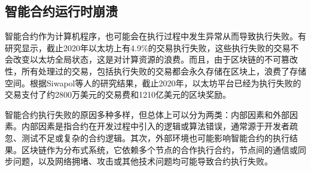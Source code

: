 \begin{enumerate}[label=(\arabic*)]
    
\end{enumerate}
\subsection{智能合约运行时崩溃}
\label{sec:智能合约运行时崩溃}
智能合约作为计算机程序，也可能会在执行过程中发生异常从而导致执行失败。有研究显示\cite{reducing2020}，截止2020年以太坊上有4.9\%的交易执行失败，这些执行失败的交易不会改变以太坊全局状态，这是对计算资源的浪费。而且，由于区块链的不可篡改性，所有处理过的交易，包括执行失败的交易都会永久存储在区块上，浪费了存储空间。根据Siwapol等人的研究结果\cite{reducing2020}，截止2020年，以太坊平台已经为执行失败的交易支付了约2800万美元的交易费和1210亿美元的区块奖励。

智能合约执行失败的原因多种多样，但总体上可以分为两类：内部因素和外部因素。内部因素是指合约在开发过程中引入的逻辑或算法错误，通常源于开发者疏忽、测试不足或复杂的合约逻辑。其次，外部环境也可能影响智能合约的执行结果。区块链作为分布式系统，它依赖多个节点的合作执行合约，节点间的通信或同步问题，以及网络拥堵、攻击或其他技术问题均可能导致合约执行失败。

